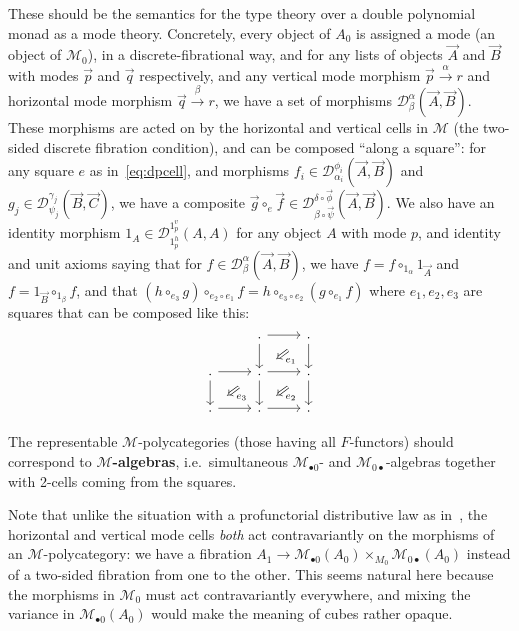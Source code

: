 \documentclass{article}
\theoremstyle{definition}
\theoremstyle{remark}
\def\M{\mathcal{M}}
\def\Mh{\M_{\bullet 0}}
\def\Mv{\M_{0\bullet}}
\def\DD#1#2{\mathcal{D}^{#1}_{#2}}
\let\xto\xrightarrow
\begin{document}
These should be the semantics for the type theory over a double polynomial monad as a mode theory.
Concretely, every object of $A_0$ is assigned a mode (an object of $\M_0$), in a discrete-fibrational way, and for any lists of objects $\vec{A}$ and $\vec{B}$ with modes $\vec{p}$ and $\vec{q}$ respectively, and any vertical mode morphism $\vec{p} \xto{\alpha} r$ and horizontal mode morphism $\vec{q} \xto{\beta} r$, we have a set of morphisms $\DD\alpha\beta(\vec{A},\vec{B})$.
These morphisms are acted on by the horizontal and vertical cells in $\M$ (the two-sided discrete fibration condition), and can be composed ``along a square'': for any square $e$ as in~\eqref{eq:dpcell}, and morphisms $f_i \in \DD{\phi_i}{\alpha_i}(\vec{A},\vec{B})$ and $g_j \in \DD{\gamma_j}{\psi_j}(\vec{B},\vec{C})$, we have a composite $\vec{g} \circ_e \vec{f} \in \DD{\delta\circ \vec{\phi}}{\beta\circ\vec{\psi}}(\vec{A},\vec{B})$.
We also have an identity morphism $1_A \in \DD{1_p^v}{1_p^h}(A,A)$ for any object $A$ with mode $p$, and identity and unit axioms saying that for $f\in\DD{\alpha}{\beta}(\vec{A},\vec{B})$, we have $f = f \circ_{1_\alpha} 1_{\vec{A}}$ and $f = 1_{\vec{B}} \circ_{1_\beta} f$, and that $(h\circ_{e_3}g)\circ_{e_2 \circ e_1} f = h\circ_{e_3\circ e_2} (g\circ_{e_1} f)$ where $e_1,e_2,e_3$ are squares that can be composed like this:
\[\begin{tikzcd}
  & . \ar[r] \ar[d]
  \ar[from=r,to=d,phantom,""{name=1,near start},""{name=2,near end}]
  \ar[Rightarrow,from=1,to=2,"e_1"]
  & .\ar[d] \\
  .\ar[r] \ar[d]
  \ar[from=r,to=d,phantom,""{name=3,near start},""{name=4,near end}]
  \ar[Rightarrow,from=3,to=4,"e_3"]
  & .\ar[r] \ar[d]
  \ar[from=r,to=d,phantom,""{name=5,near start},""{name=6,near end}]
  \ar[Rightarrow,from=5,to=6,"e_2"]
  & .\ar[d] \\
  .\ar[r] & .\ar[r] & .
\end{tikzcd}\]

The representable $\M$-polycategories (those having all $F$-functors) should correspond to \textbf{$\M$-algebras}, i.e.\ simultaneous $\Mh$- and $\Mv$-algebras together with 2-cells coming from the squares.

Note that unlike the situation with a profunctorial distributive law as in~\cite{garner:polycats}, the horizontal and vertical mode cells \emph{both} act contravariantly on the morphisms of an $\M$-polycategory: we have a fibration $A_1 \to \Mh(A_0) \times_{M_0} \Mv(A_0)$ instead of a two-sided fibration from one to the other.
This seems natural here because the morphisms in $\M_0$ must act contravariantly everywhere, and mixing the variance in $\Mh(A_0)$ would make the meaning of cubes rather opaque.
\end{document}
